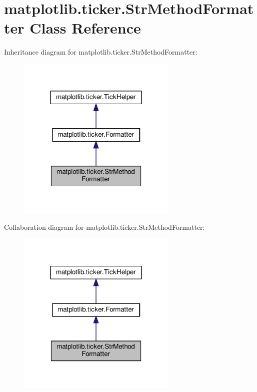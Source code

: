 \hypertarget{classmatplotlib_1_1ticker_1_1StrMethodFormatter}{}\section{matplotlib.\+ticker.\+Str\+Method\+Formatter Class Reference}
\label{classmatplotlib_1_1ticker_1_1StrMethodFormatter}


Inheritance diagram for matplotlib.\+ticker.\+Str\+Method\+Formatter\+:
\nopagebreak
\begin{figure}[H]
\begin{center}
\leavevmode
\includegraphics[width=216pt]{classmatplotlib_1_1ticker_1_1StrMethodFormatter__inherit__graph}
\end{center}
\end{figure}


Collaboration diagram for matplotlib.\+ticker.\+Str\+Method\+Formatter\+:
\nopagebreak
\begin{figure}[H]
\begin{center}
\leavevmode
\includegraphics[width=216pt]{classmatplotlib_1_1ticker_1_1StrMethodFormatter__coll__graph}
\end{center}
\end{figure}
